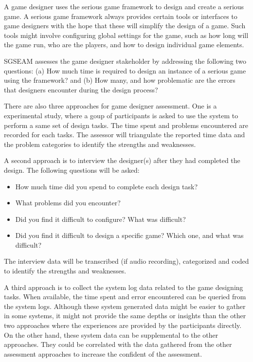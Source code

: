 A game designer uses the serious game framework to design and create a serious game.
A serious game framework always provides certain tools or interfaces to game designers
with the hope that these will simplify the design of a game. Such tools might involve
configuring global settings for the game, such as how long will the game run, who are the
players, and how to design individual game elements.

SGSEAM assesses the game designer stakeholder by addressing the following two questions: (a) How
much time is required to design an instance of a serious game using the framework? and (b) How
many, and how problematic are the errors that designers encounter during the design process?

There are also three approaches for game designer assessment. One is a experimental study, where a
goup of participants is asked to use the system to perform a same set of design tasks. The time
spent and problems encountered are recorded for each tasks. The assessor will triangulate the
reported time data and the problem categories to identify the strengths and weaknesses.

A second approach is to interview the designer(s) after they had completed the design.
The following questions will be asked:
\begin{itemize}
\item How much time did you spend to complete each design task?
\item What problems did you encounter?
\item Did you find it difficult to configure? What was difficult?
\item Did you find it difficult to design a specific game? Which one, and what was difficult?
\end{itemize}

The interview data will be transcribed (if audio recording), categorized and coded to identify the
strengths and weaknesses.

A third approach is to collect the system log data related to the game designing tasks. When
available, the time spent and error encountered can be queried from the system logs. Although these
system generated data might be easier to gather in some systems, it might not provide the same
depths or insights than the other two approaches where the experiences are provided by the
participants directly. On the other hand, these system data can be supplemental to the other
approaches. They could be correlated with the data gathered from the other assessment approaches
 to increase the confident of the assessment.

